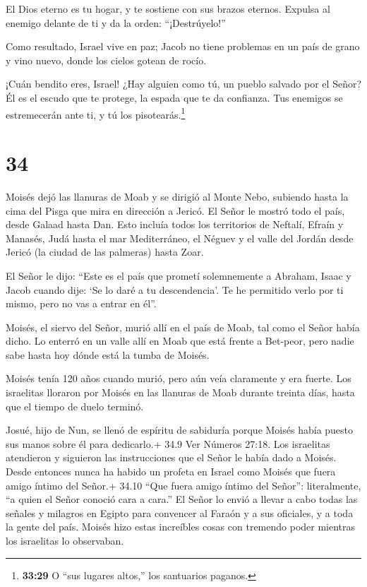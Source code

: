  El Dios eterno es tu hogar, y te sostiene con sus brazos
eternos. Expulsa al enemigo delante de ti y da la orden:
``¡Destrúyelo!''

 Como resultado, Israel vive en paz; Jacob no tiene
problemas en un país de grano y vino nuevo, donde los cielos gotean de
rocío.

 ¡Cuán bendito eres, Israel! ¿Hay alguien como tú, un
pueblo salvado por el Señor? Él es el escudo que te protege, la espada
que te da confianza. Tus enemigos se estremecerán ante ti, y tú los
pisotearás.\footnote{\textbf{33:29} O ``sus lugares altos,'' los
  santuarios paganos.}

\hypertarget{section-33}{%
\section{34}\label{section-33}}

 Moisés dejó las llanuras de Moab y se dirigió al Monte
Nebo, subiendo hasta la cima del Pisga que mira en dirección a Jericó.
El Señor le mostró todo el país, desde Galaad hasta Dan. 
Esto incluía todos los territorios de Neftalí, Efraín y Manasés, Judá
hasta el mar Mediterráneo,  el Néguev y el valle del Jordán
desde Jericó (la ciudad de las palmeras) hasta Zoar.

 El Señor le dijo: ``Este es el país que prometí
solemnemente a Abraham, Isaac y Jacob cuando dije: `Se lo daré a tu
descendencia'. Te he permitido verlo por ti mismo, pero no vas a entrar
en él''.

 Moisés, el siervo del Señor, murió allí en el país de Moab,
tal como el Señor había dicho.  Lo enterró en un valle allí
en Moab que está frente a Bet-peor, pero nadie sabe hasta hoy dónde está
la tumba de Moisés.

 Moisés tenía 120 años cuando murió, pero aún veía
claramente y era fuerte.  Los israelitas lloraron por Moisés
en las llanuras de Moab durante treinta días, hasta que el tiempo de
duelo terminó.

 Josué, hijo de Nun, se llenó de espíritu de sabiduría
porque Moisés había puesto sus manos sobre él para dedicarlo.+ 34.9 Ver
Números 27:18. Los israelitas atendieron y siguieron las instrucciones
que el Señor le había dado a Moisés.  Desde entonces nunca
ha habido un profeta en Israel como Moisés que fuera amigo íntimo del
Señor.+ 34.10 ``Que fuera amigo íntimo del Señor'': literalmente, ``a
quien el Señor conoció cara a cara.''  El Señor lo envió a
llevar a cabo todas las señales y milagros en Egipto para convencer al
Faraón y a sus oficiales, y a toda la gente del país. 
Moisés hizo estas increíbles cosas con tremendo poder mientras los
israelitas lo observaban.

